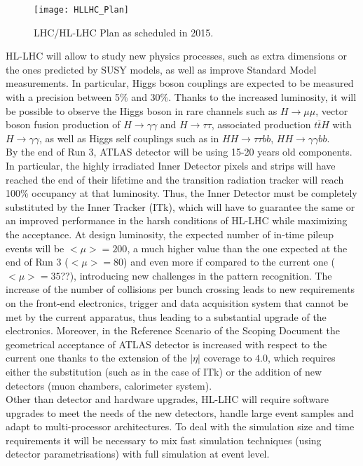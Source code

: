 \documentclass[a4paper,twoside,12pt]{article}
\begin{document}
\begin{figure} [h]
	\texttt{[image: HLLHC\_Plan]}
	\caption{LHC/HL-LHC Plan as scheduled in 2015\cite{scoping}.}
	\label{fig:HLLHC_Plan}
\end{figure}

HL-LHC will allow to study new physics processes, such as extra dimensions or the ones predicted by SUSY models, as well as improve Standard Model measurements. In particular, Higgs boson 
couplings are expected to be measured with a precision between 5\% and 30\%\cite{loi}. Thanks to the increased luminosity, it will be possible to observe the Higgs boson in rare
channels such as  $H \rightarrow \mu\mu$, vector boson 
fusion production of $H \rightarrow \gamma\gamma$ and $H \rightarrow \tau\tau$, associated production $t\bar{t}H$ with $H \rightarrow \gamma\gamma$, as well as Higgs self couplings
such as in $HH \rightarrow \tau\tau b b$, $HH \rightarrow \gamma\gamma b b$.\\

By the end of Run 3, ATLAS detector will be using 15-20 years old components. In particular,
the highly irradiated Inner Detector pixels and strips will have reached the end of their
lifetime and the transition radiation tracker will reach 100\% occupancy at that luminosity. Thus, the Inner Detector must be completely substituted by the Inner Tracker (ITk), which will
have to guarantee the same or an improved performance in the harsh conditions of HL-LHC while maximizing the acceptance. At design luminosity, the expected number of in-time pileup events will be $<\mu > = 200$, a much
higher value than the one expected at the end of Run 3 ($<\mu > = 80$) and even more if 
compared to the current one ($<\mu > = 35$??), introducing new challenges in the pattern
recognition. The increase of the number
of collisions per bunch crossing leads to new requirements on the front-end electronics, trigger and data acquisition system that cannot be met by the current apparatus, thus leading to a 
substantial upgrade of the electronics. Moreover, in the Reference Scenario of the Scoping Document\cite{scoping} the geometrical acceptance of ATLAS detector is increased with respect to 
the current one thanks to the extension of the $|\eta|$ coverage to $4.0$, which requires either the substitution (such as in the case of ITk) or the addition of new detectors (muon chambers,
calorimeter system). \\

Other than detector and hardware upgrades, HL-LHC will require software upgrades to meet the needs of the new detectors, handle large event samples and adapt to multi-processor
architectures. To deal with the simulation size and time requirements it will be necessary to mix fast simulation techniques (using detector parametrisations) with full simulation at event level.
\end{document}

